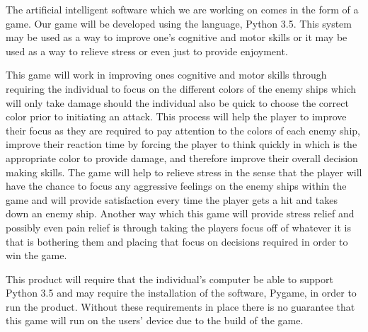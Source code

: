 The artificial intelligent software which we are working on comes in
the form of a game. Our game will be developed using the language,
Python 3.5. This system may be used as a way to improve one’s
cognitive and motor skills or it may be used as a way to relieve
stress or even just to provide enjoyment.

This game will work in improving ones cognitive and motor skills
through requiring the individual to focus on the different colors of
the enemy ships which will only take damage should the individual
also be quick to choose the correct color prior to initiating an
attack. This process will help the player to improve their focus as
they are required to pay attention to the colors of each enemy ship,
improve their reaction time by forcing the player to think quickly
in which is the appropriate color to provide damage, and therefore
improve their overall decision making skills. The game will help to
relieve stress in the sense that the player will have the chance to
focus any aggressive feelings on the enemy ships within the game and
will provide satisfaction every time the player gets a hit and takes
down an enemy ship. Another way which this game will provide stress
relief and possibly even pain relief is through taking the players
focus off of whatever it is that is bothering them and placing that
focus on decisions required in order to win the game.

This product will require that the individual’s computer be able to
support Python 3.5 and may require the installation of the software,
Pygame, in order to run the product. Without these requirements in
place there is no guarantee that this game will run on the users’
device due to the build of the game.
